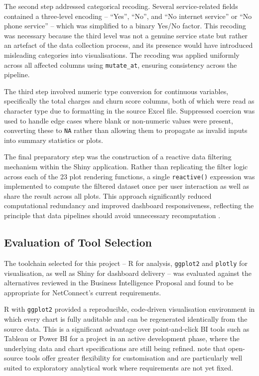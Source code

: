 \documentclass[12pt,a4paper]{article}
\begin{document}
The second step addressed categorical recoding. Several service-related fields contained a three-level encoding -- ``Yes'', ``No'', and ``No internet service'' or ``No phone service'' -- which was simplified to a binary Yes/No factor. This recoding was necessary because the third level was not a genuine service state but rather an artefact of the data collection process, and its presence would have introduced misleading categories into visualisations. The recoding was applied uniformly across all affected columns using \texttt{mutate\_at}, ensuring consistency across the pipeline.

The third step involved numeric type conversion for continuous variables, specifically the total charges and churn score columns, both of which were read as character type due to formatting in the source Excel file. Suppressed coercion was used to handle edge cases where blank or non-numeric values were present, converting these to \texttt{NA} rather than allowing them to propagate as invalid inputs into summary statistics or plots.

The final preparatory step was the construction of a reactive data filtering mechanism within the Shiny application. Rather than replicating the filter logic across each of the 23 plot rendering functions, a single \texttt{reactive()} expression was implemented to compute the filtered dataset once per user interaction as well as share the result across all plots. This approach significantly reduced computational redundancy and improved dashboard responsiveness, reflecting the principle that data pipelines should avoid unnecessary recomputation \parencite{Sarker2021}.

\subsection{Evaluation of Tool Selection}

The toolchain selected for this project -- R for analysis, \texttt{ggplot2} and \texttt{plotly} for visualisation, as well as Shiny for dashboard delivery -- was evaluated against the alternatives reviewed in the Business Intelligence Proposal and found to be appropriate for NetConnect's current requirements.

R with \texttt{ggplot2} provided a reproducible, code-driven visualisation environment in which every chart is fully auditable and can be regenerated identically from the source data. This is a significant advantage over point-and-click BI tools such as Tableau or Power BI for a project in an active development phase, where the underlying data and chart specifications are still being refined. \textcite{Gahar2024} note that open-source tools offer greater flexibility for customisation and are particularly well suited to exploratory analytical work where requirements are not yet fixed.
\end{document}
